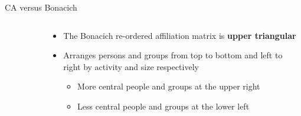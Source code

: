 \documentclass[
  ignorenonframetext,
]{beamer}
\providecommand{\tightlist}{%
  \setlength{\itemsep}{0pt}\setlength{\parskip}{0pt}}\usepackage{longtable,booktabs,array}
\begin{document}
\begin{frame}{CA versus Bonacich}
\begin{columns}[T]
\begin{column}{0.5\textwidth}
\begin{figure}
\end{figure}
\end{column}

\begin{column}{0.5\textwidth}
\begin{itemize}
\tightlist
\item
  The Bonacich re-ordered affiliation matrix is \textbf{upper
  triangular}
\item
  Arranges persons and groups from top to bottom and left to right by
  activity and size respectively

  \begin{itemize}
  \tightlist
  \item
    More central people and groups at the upper right
  \item
    Less central people and groups at the lower left
  \end{itemize}
\end{itemize}
\end{column}
\end{columns}
\end{frame}
\end{document}
